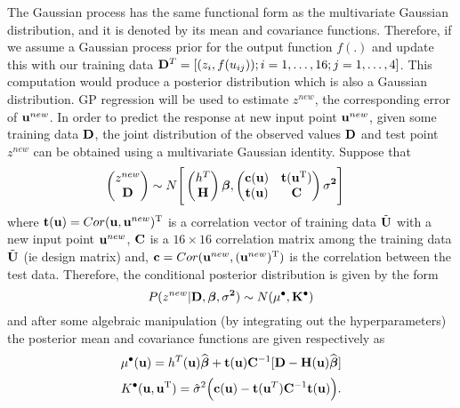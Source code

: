The Gaussian process has the same functional form as the multivariate Gaussian distribution, and it is denoted by its mean and covariance functions. Therefore, if we assume a Gaussian process prior for the output function $f(.)$ and update this with our training data ${\bf D}^T=[(z_i, f(u_{ij})); i=1,\ldots,16; j=1,\ldots,4]$. This computation would produce a posterior distribution which is also a Gaussian distribution. GP regression will be used to estimate $z^{new}$, the corresponding error of ${\bf u}^{new}$. In order to predict the response at new input point ${\bf u}^{new}$, given some training data ${\bf D}$, the joint distribution of the observed values ${\bf D}$ and test point $z^{new}$ can be obtained using a multivariate Gaussian identity. 
Suppose that
\begin{align}
\begin{pmatrix}
z^{new}\\
{\bf D}
\end{pmatrix}
&
\sim
N \Bigg[
\begin{pmatrix}
h^T\\
{\bf H}
\end{pmatrix}\boldsymbol{\beta}
,
\bf 
\begin{pmatrix}
{\bf c}({\bf u})& {\bf t}({\bf u}^{\rm T})\\
{\bf t}({\bf u}) & {\bf C}
\end{pmatrix}\sigma^2
\Bigg]
\end{align}
where ${\bf t}({\bf u})=Cor({\bf u},{\bf u}^{new})^{\rm T}$ is a correlation vector of training data ${\tilde {\bf U}}$ with a new input point ${\bf u}^{new}$, ${\bf C}$ is a $16 \times 16$ correlation matrix among the training data ${\tilde {\bf U}}$ (ie design matrix) and, ${\bf c}=Cor({\bf u}^{new},({\bf u}^{new})^{\rm T})$ is the correlation between the test data. Therefore, the conditional posterior distribution is given by the form
\begin{equation}
P(z^{new}|\mathbf{{\bf D}, \boldsymbol \beta,\sigma^2}) \sim N(\mu^{\bullet},\bf{K}^{\bullet})
\end{equation}
and after some algebraic manipulation (by integrating out the hyperparameters) the posterior mean and covariance functions are given respectively as
\begin{equation}\label{res1}
\mu^{\bullet}(\mathbf{u})=h^{T}(\mathbf{u})\widehat{\boldsymbol \beta}+ {\bf t}({\bf u}){\bf C}^{-1}[{\bf D}-{\bf H}({\bf u})\widehat{\boldsymbol\beta}]
\end{equation}
\begin{equation}\label{res2}
K^{\bullet}({\bf u},{\bf u}^{\rm T})=\hat\sigma^2\Big({\bf c}({\bf u})-{\bf t}({\bf u}^T) {\bf C}^{-1}{\bf t}(\mathbf{u})\Big).
\end{equation}
